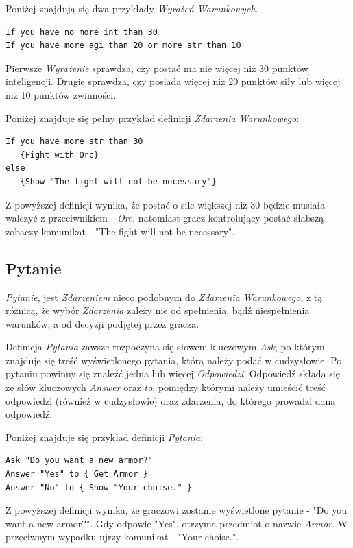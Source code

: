 \documentclass[openright]{xmgr}
\begin{document}
Poniżej znajdują się dwa przykłady \textit{Wyrażeń Warunkowych}.
\begin{verbatim}
If you have no more int than 30
If you have more agi than 20 or more str than 10
\end{verbatim}

Pierwsze \textit{Wyrażenie} sprawdza, czy postać ma nie więcej niż 30 punktów inteligencji. Drugie sprawdza, czy posiada więcej niż 20 punktów siły lub więcej niż 10 punktów zwinności.

Poniżej znajduje się pełny przykład definicji \textit{Zdarzenia Warunkowego}: 
\begin{verbatim}
If you have more str than 30 
   {Fight with Orc}
else 
   {Show "The fight will not be necessary"}
\end{verbatim}

Z powyższej definicji wynika, że postać o sile większej niż 30 będzie musiała walczyć z przeciwnikiem - \textit{Orc}, natomiast gracz kontrolujący postać słabszą zobaczy komunikat - "The fight will not be necessary".

\subsection{Pytanie}
\textit{Pytanie}, jest \textit{Zdarzeniem} nieco podobnym do \textit{Zdarzenia Warunkowego}, z tą różnicą, że wybór \textit{Zdarzenia} zależy nie od spełnienia, bądź niespełnienia warunków, a od decyzji podjętej przez gracza.

Definicja \textit{Pytania} zawsze rozpoczyna się słowem kluczowym \textit{Ask}, po którym znajduje się treść wyświetlonego pytania, którą należy podać w cudzysłowie. Po pytaniu powinny się znaleźć jedna lub więcej \textit{Odpowiedzi}. Odpowiedź składa się ze słów kluczowych \textit{Answer} oraz \textit{to}, pomiędzy którymi należy umieścić treść odpowiedzi (również w cudzysłowie) oraz zdarzenia, do którego prowadzi dana odpowiedź. 

Poniżej znajduje się przykład definicji \textit{Pytania}:
\begin{verbatim}
Ask "Do you want a new armor?"
Answer "Yes" to { Get Armor }
Answer "No" to { Show "Your choise." }
\end{verbatim}

Z powyższej definicji wynika, że graczowi zostanie wyświetlone pytanie - "Do you want a new armor?". Gdy odpowie "Yes", otrzyma przedmiot o nazwie \textit{Armor}. W przeciwnym wypadku ujrzy komunikat - "Your choise.".
\end{document}
